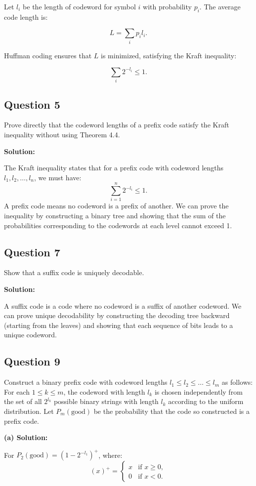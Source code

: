 \documentclass[a4paper,10pt]{article}
\begin{document}
Let $l_i$ be the length of codeword for symbol $i$ with probability $p_i$. The average code length is:

$$
L = \sum_{i} p_i l_i.
$$

Huffman coding ensures that $L$ is minimized, satisfying the Kraft inequality:

$$
\sum_{i} 2^{-l_i} \leq 1.
$$

\subsection*{Question 5}
Prove directly that the codeword lengths of a prefix code satisfy the Kraft inequality without using Theorem 4.4.

\textbf{Solution:}

The Kraft inequality states that for a prefix code with codeword lengths $ l_1, l_2, \dots, l_n $, we must have:
$$
\sum_{i=1}^{n} 2^{-l_i} \leq 1.
$$
A prefix code means no codeword is a prefix of another. We can prove the inequality by constructing a binary tree and showing that the sum of the probabilities corresponding to the codewords at each level cannot exceed 1.

\subsection*{Question 7}
Show that a suffix code is uniquely decodable.

\textbf{Solution:}

A suffix code is a code where no codeword is a suffix of another codeword. We can prove unique decodability by constructing the decoding tree backward (starting from the leaves) and showing that each sequence of bits leads to a unique codeword.

\subsection*{Question 9}

Construct a binary prefix code with codeword lengths $ l_1 \leq l_2 \leq \dots \leq l_m $ as follows:
For each $ 1 \leq k \leq m $, the codeword with length $ l_k $ is chosen independently from the set of all $ 2^{l_k} $ possible binary strings with length $ l_k $ according to the uniform distribution. Let $ P_m(\text{good}) $ be the probability that the code so constructed is a prefix code.

\textbf{(a) Solution:}

For $ P_2(\text{good}) = (1 - 2^{-l_1})^+ $, where:
$$
(x)^+ = \begin{cases}
x & \text{if } x \geq 0, \\
0 & \text{if } x < 0.
\end{cases}
$$
\end{document}
